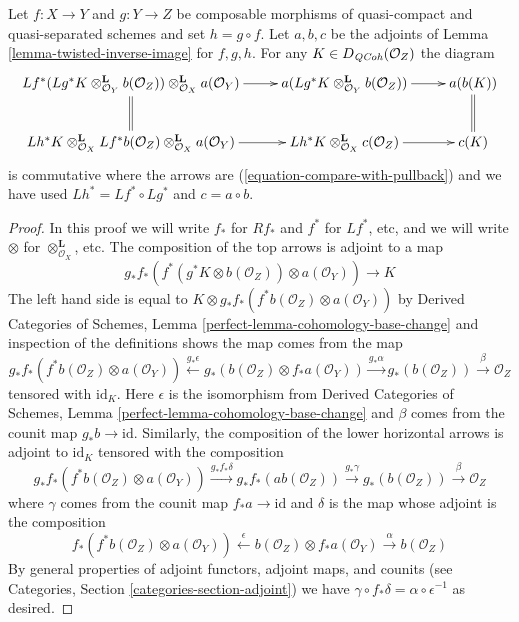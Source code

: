 \begin{lemma}
\label{lemma-transitivity-compare-with-pullback}
Let $f : X \to Y$ and $g : Y \to Z$ be composable morphisms of quasi-compact
and quasi-separated schemes and set $h = g \circ f$. Let $a, b, c$ be the
adjoints of Lemma \ref{lemma-twisted-inverse-image} for $f, g, h$.
For any $K \in D_{\mathit{QCoh}}(\mathcal{O}_Z)$ the diagram
$$
\xymatrix{
Lf^*(Lg^*K \otimes_{\mathcal{O}_Y}^\mathbf{L}
b(\mathcal{O}_Z)) \otimes_{\mathcal{O}_X}^\mathbf{L} a(\mathcal{O}_Y)
\ar@{=}[d] \ar[r] &
a(Lg^*K \otimes_{\mathcal{O}_Y}^\mathbf{L} b(\mathcal{O}_Z)) \ar[r] &
a(b(K)) \ar@{=}[d] \\
Lh^*K \otimes_{\mathcal{O}_X}^\mathbf{L} Lf^*b(\mathcal{O}_Z)
\otimes_{\mathcal{O}_X}^\mathbf{L} a(\mathcal{O}_Y) \ar[r] &
Lh^*K \otimes_{\mathcal{O}_X}^\mathbf{L} c(\mathcal{O}_Z) \ar[r] &
c(K)
}
$$
is commutative where the arrows are (\ref{equation-compare-with-pullback})
and we have used $Lh^* = Lf^* \circ Lg^*$ and $c = a \circ b$.
\end{lemma}

\begin{proof}
In this proof we will write $f_*$ for $Rf_*$ and $f^*$ for $Lf^*$, etc,
and we will write $\otimes$ for $\otimes^\mathbf{L}_{\mathcal{O}_X}$, etc.
The composition of the top arrows is adjoint to a map
$$
g_*f_*(f^*(g^*K \otimes b(\mathcal{O}_Z)) \otimes a(\mathcal{O}_Y)) \to K
$$
The left hand side is equal to
$K \otimes g_*f_*(f^*b(\mathcal{O}_Z) \otimes a(\mathcal{O}_Y))$ by
Derived Categories of Schemes, Lemma
\ref{perfect-lemma-cohomology-base-change}
and inspection of the definitions shows the map comes from the map
$$
g_*f_*(f^*b(\mathcal{O}_Z) \otimes a(\mathcal{O}_Y))
\xleftarrow{g_*\epsilon}
g_*(b(\mathcal{O}_Z) \otimes f_*a(\mathcal{O}_Y)) \xrightarrow{g_*\alpha}
g_*(b(\mathcal{O}_Z)) \xrightarrow{\beta} \mathcal{O}_Z
$$
tensored with $\text{id}_K$. Here $\epsilon$ is the isomorphism from
Derived Categories of Schemes, Lemma
\ref{perfect-lemma-cohomology-base-change} and
$\beta$ comes from the counit map
$g_*b \to \text{id}$. Similarly, the composition of the lower
horizontal arrows is adjoint to $\text{id}_K$ tensored with the composition 
$$
g_*f_*(f^*b(\mathcal{O}_Z) \otimes a(\mathcal{O}_Y)) \xrightarrow{g_*f_*\delta}
g_*f_*(ab(\mathcal{O}_Z)) \xrightarrow{g_*\gamma}
g_*(b(\mathcal{O}_Z)) \xrightarrow{\beta}
\mathcal{O}_Z
$$
where $\gamma$ comes from the counit map $f_*a \to \text{id}$
and $\delta$ is the map whose adjoint is the composition
$$
f_*(f^*b(\mathcal{O}_Z) \otimes a(\mathcal{O}_Y))
\xleftarrow{\epsilon}
b(\mathcal{O}_Z) \otimes f_*a(\mathcal{O}_Y) \xrightarrow{\alpha}
b(\mathcal{O}_Z)
$$
By general properties of adjoint functors, adjoint maps, and counits
(see Categories, Section \ref{categories-section-adjoint})
we have $\gamma \circ f_*\delta = \alpha \circ \epsilon^{-1}$ as desired.
\end{proof}





